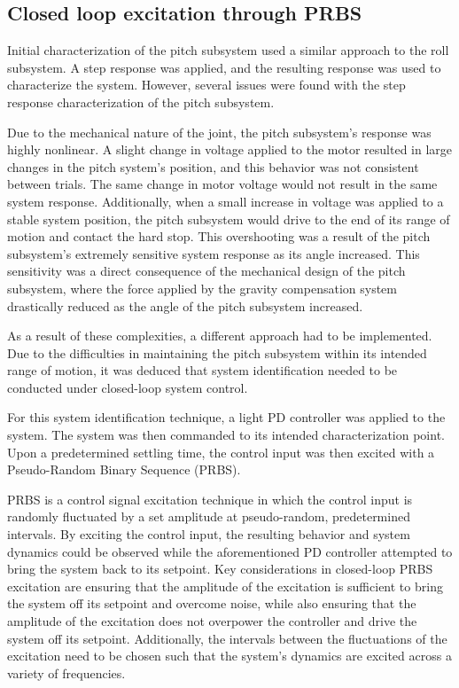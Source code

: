 \subsection{Closed loop excitation through PRBS}

Initial characterization of the pitch subsystem used a similar approach to the roll subsystem. A step response was applied, and the resulting response was used to characterize the system. However, several issues were found with the step response characterization of the pitch subsystem.

Due to the mechanical nature of the joint, the pitch subsystem's response was highly nonlinear. A slight change in voltage applied to the motor resulted in large changes in the pitch system's position, and this behavior was not consistent between trials. The same change in motor voltage would not result in the same system response. Additionally, when a small increase in voltage was applied to a stable system position, the pitch subsystem would drive to the end of its range of motion and contact the hard stop. This overshooting was a result of the pitch subsystem's extremely sensitive system response as its angle increased. This sensitivity was a direct consequence of the mechanical design of the pitch subsystem, where the force applied by the gravity compensation system drastically reduced as the angle of the pitch subsystem increased.

As a result of these complexities, a different approach had to be implemented. Due to the difficulties in maintaining the pitch subsystem within its intended range of motion, it was deduced that system identification needed to be conducted under closed-loop system control.

For this system identification technique, a light PD controller was applied to the system. The system was then commanded to its intended characterization point. Upon a predetermined settling time, the control input was then excited with a Pseudo-Random Binary Sequence (PRBS).

PRBS is a control signal excitation technique in which the control input is randomly fluctuated by a set amplitude at pseudo-random, predetermined intervals. By exciting the control input, the resulting behavior and system dynamics could be observed while the aforementioned PD controller attempted to bring the system back to its setpoint. Key considerations in closed-loop PRBS excitation are ensuring that the amplitude of the excitation is sufficient to bring the system off its setpoint and overcome noise, while also ensuring that the amplitude of the excitation does not overpower the controller and drive the system off its setpoint. Additionally, the intervals between the fluctuations of the excitation need to be chosen such that the system's dynamics are excited across a variety of frequencies.


